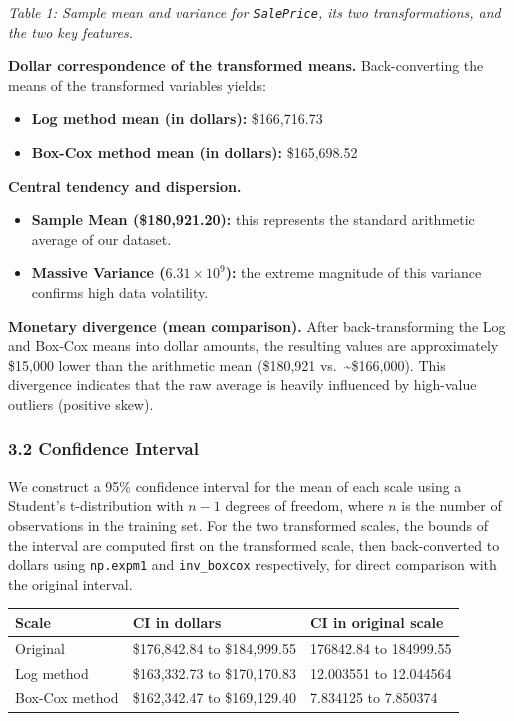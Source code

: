\emph{Table 1: Sample mean and variance for \texttt{SalePrice}, its two
transformations, and the two key features.}

\textbf{Dollar correspondence of the transformed means.} Back-converting
the means of the transformed variables yields:

\begin{itemize}
\tightlist
\item
  \textbf{Log method mean (in dollars):} \$166,716.73
\item
  \textbf{Box-Cox method mean (in dollars):} \$165,698.52
\end{itemize}

\textbf{Central tendency and dispersion.}

\begin{itemize}
\tightlist
\item
  \textbf{Sample Mean (\$180,921.20):} this represents the standard
  arithmetic average of our dataset.
\item
  \textbf{Massive Variance (\(6.31 \times 10^9\)):} the extreme
  magnitude of this variance confirms high data volatility.
\end{itemize}

\textbf{Monetary divergence (mean comparison).} After back-transforming
the Log and Box-Cox means into dollar amounts, the resulting values are
approximately \$15,000 lower than the arithmetic mean (\$180,921
vs.~\textasciitilde\$166,000). This divergence indicates that the raw
average is heavily influenced by high-value outliers (positive skew).

\subsubsection{3.2 Confidence Interval}\label{confidence-interval}

We construct a 95\% confidence interval for the mean of each scale using
a Student's t-distribution with \(n - 1\) degrees of freedom, where
\(n\) is the number of observations in the training set. For the two
transformed scales, the bounds of the interval are computed first on the
transformed scale, then back-converted to dollars using
\texttt{np.expm1} and \texttt{inv\_boxcox} respectively, for direct
comparison with the original interval.

\begin{longtable}[]{@{}lll@{}}
\toprule\noalign{}
Scale & CI in dollars & CI in original scale \\
\midrule\noalign{}
\endhead
\bottomrule\noalign{}
\endlastfoot
Original & \$176,842.84 to \$184,999.55 & 176842.84 to 184999.55 \\
Log method & \$163,332.73 to \$170,170.83 & 12.003551 to 12.044564 \\
Box-Cox method & \$162,342.47 to \$169,129.40 & 7.834125 to 7.850374 \\
\end{longtable}

